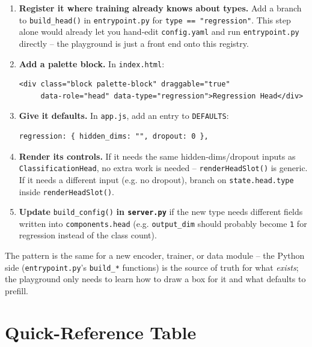 \documentclass[11pt]{article}
\begin{document}
\begin{enumerate}
  \item \textbf{Register it where training already knows about types.} Add a
  branch to \lstinline{build_head()} in \lstinline{entrypoint.py} for
  \lstinline{type == "regression"}. This step alone would already let you
  hand-edit \lstinline{config.yaml} and run \lstinline{entrypoint.py}
  directly -- the playground is just a front end onto this registry.
  \item \textbf{Add a palette block.} In \lstinline{index.html}:
  \begin{lstlisting}
<div class="block palette-block" draggable="true"
     data-role="head" data-type="regression">Regression Head</div>
  \end{lstlisting}
  \item \textbf{Give it defaults.} In \lstinline{app.js}, add an entry to
  \lstinline{DEFAULTS}:
  \begin{lstlisting}
regression: { hidden_dims: "", dropout: 0 },
  \end{lstlisting}
  \item \textbf{Render its controls.} If it needs the same
  hidden-dims/dropout inputs as \lstinline{ClassificationHead}, no extra
  work is needed -- \lstinline{renderHeadSlot()} is generic. If it needs a
  different input (e.g. no dropout), branch on \lstinline{state.head.type}
  inside \lstinline{renderHeadSlot()}.
  \item \textbf{Update} \lstinline{build_config()} \textbf{in
  \lstinline{server.py}} if the new type needs different fields written into
  \lstinline{components.head} (e.g. \lstinline{output_dim} should probably
  become \lstinline{1} for regression instead of the class count).
\end{enumerate}

The pattern is the same for a new encoder, trainer, or data module -- the
Python side (\lstinline{entrypoint.py}'s \lstinline{build_*} functions) is
the source of truth for what \emph{exists}; the playground only needs to
learn how to draw a box for it and what defaults to prefill.

\section{Quick-Reference Table}
\end{document}
